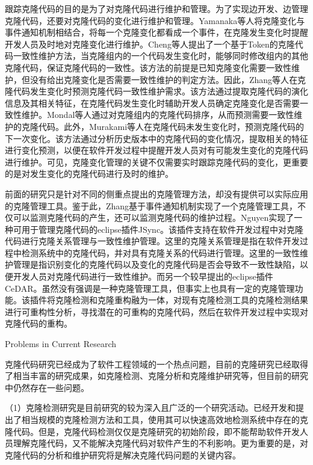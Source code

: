 跟踪克隆代码的目的是为了对克隆代码进行维护和管理。为了实现边开发、边管理克隆代码，还要对克隆代码的变化进行维护和管理。Yamanaka等人\cite{yamanaka2013applying}将克隆变化与事件通知机制相结合，将每一个克隆变化都看成一个事件，在克隆发生变化时提醒开发人员及时地对克隆变化进行维护。Cheng等人\cite{cheng2016rule}提出了一个基于Token的克隆代码一致性维护方法，当克隆组内的一个代码发生变化时，能够同时修改组内的其他克隆代码，保证克隆代码的一致性。该方法的前提是已知克隆变化需要一致性维护，但没有给出克隆变化是否需要一致性维护的判定方法。因此，Zhang等人\cite{zhang2016predicting}在克隆代码发生变化时预测克隆代码一致性维护需求。该方法通过提取克隆代码的演化信息及其相关特征，在克隆代码发生变化时辅助开发人员确定克隆变化是否需要一致性维护。Mondal等人通过对克隆组内的克隆代码排序，从而预测需要一致性维护的克隆代码\cite{mondal2014prediction}。此外，Murakami等人在克隆代码未发生变化时，预测克隆代码的下一次变化\cite{murakami2014predicting}。该方法通过分析历史版本中的克隆代码的变化情况，提取相关的特征进行变化预测，以便在软件开发过程中提醒开发人员对有可能发生变化的克隆代码进行维护。可见，克隆变化管理的关键不仅需要实时跟踪克隆代码的变化，更重要的是对发生变化的克隆代码进行及时的维护。

前面的研究只是针对不同的侧重点提出的克隆管理方法，却没有提供可以实际应用的克隆管理工具。鉴于此，Zhang基于事件通知机制实现了一个克隆管理工具，不仅可以监测克隆代码的产生，还可以监测克隆代码的维护过程\cite{zhang2013towards}。Nguyen实现了一种可用于管理克隆代码的eclipse插件JSync\cite{nguyen2012clone}。该插件支持在软件开发过程中对克隆代码进行克隆关系管理与一致性维护管理。这里的克隆关系管理是指在软件开发过程中检测系统中的克隆代码，并对具有克隆关系的代码进行管理。这里的一致性维护管理是指识别变化的克隆代码以及变化的克隆代码是否会导致不一致性缺陷，以便开发人员对克隆代码进行一致性维护。而另一个较早提出的eclipse插件CeDAR\cite{tairas2012increasing}。虽然没有强调是一种克隆管理工具，但事实上也具有一定的克隆管理功能。该插件将克隆检测和克隆重构融为一体，对现有克隆检测工具的克隆检测结果进行可重构性分析，寻找潜在的可重构的克隆代码，然后在软件开发过程中实现对克隆代码的重构。

{Problems in Current Research}

克隆代码研究已经成为了软件工程领域的一个热点问题，目前的克隆研究已经取得了相当丰富的研究成果，如克隆检测、克隆分析和克隆维护研究等，但目前的研究中仍然存在一些问题。

（1）克隆检测研究是目前研究的较为深入且广泛的一个研究活动。已经开发和提出了相当规模的克隆检测方法和工具，使用其可以快速高效地检测系统中存在的克隆代码。但是，克隆代码检测仅仅是克隆研究的初始阶段，即不能帮助软件开发人员理解克隆代码，又不能解决克隆代码对软件产生的不利影响。更为重要的是，对克隆代码的分析和维护研究将是解决克隆代码问题的关键内容。

